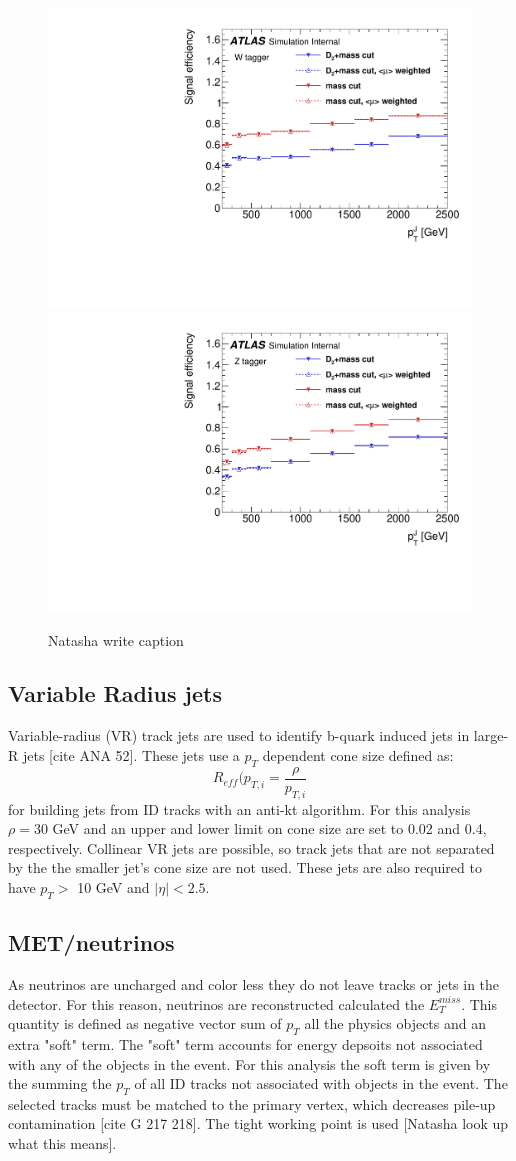 \begin{figure}[h!]
  \centering
  \includegraphics[width=0.48\hsize]{figures/Analysis/sigeffW.pdf}
  \includegraphics[width=0.48\hsize]{figures/Analysis/sigeffZ.pdf}
  \caption{Natasha write caption} 
  \label{fig:wztag_eff}
\end{figure} 
\FloatBarrier




\subsection{Variable Radius jets}
Variable-radius (VR) track jets are used to identify b-quark induced jets in large-R jets [cite ANA 52]. These jets use a $p_{T}$ dependent cone size defined as: 
\begin{equation}
R_{eff}(p_{T, i} = \frac{\rho}{p_{T,i}}
\end{equation}
for building jets from ID tracks with an anti-kt algorithm. For this analysis $\rho=30$ GeV and an upper and lower limit on cone size are set to 0.02 and 0.4, respectively. Collinear VR jets are possible, so track jets that are not separated by the the smaller jet's cone size are not used. These jets are also required to have $p_{T} > $ 10 GeV and $|\eta| < 2.5$. 


\subsection{MET/neutrinos}
As neutrinos are uncharged and color less they do not leave tracks or jets in the detector. For this reason, neutrinos are reconstructed calculated the $E_{T}^{miss}$. This quantity is defined as negative vector sum of $p_{T}$ all the physics objects and an extra "soft" term. The "soft" term accounts for energy depsoits not associated with any of the objects in the event. For this analysis the soft term is given by the summing the $p_{T}$ of all ID tracks not associated with objects in the event. The selected tracks must be matched to the primary vertex, which decreases pile-up contamination [cite G 217 218]. The tight working point is used [Natasha look up what this means].  

